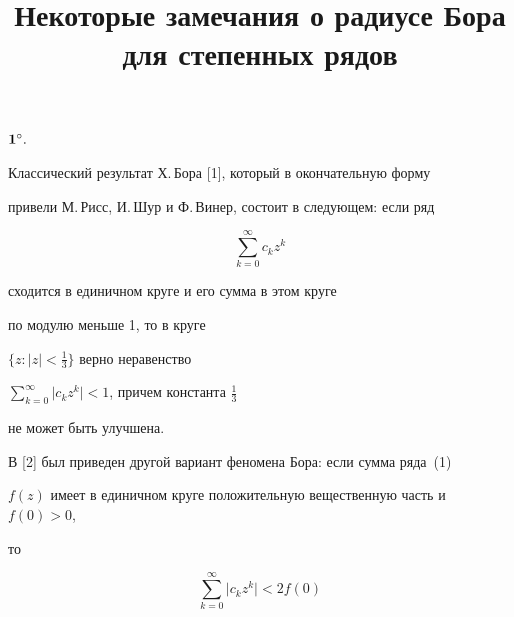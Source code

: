

\title{Некоторые замечания о радиусе Бора\\


для степенных рядов}





\date{}




\pagestyle{plain} %







\maketitle


\label{begin}











${\bold 1^\circ.}$


Классический результат Х.\,Бора [1], который в окончательную форму


привели М.\,Рисс, И.\,Шур и Ф.\,Винер, состоит в следующем: если ряд


\begin{equation}


\sum_{k=0}^{\infty} c_k z^k


\end{equation}


сходится в единичном круге и его сумма в этом круге


по модулю меньше 1, то в круге


$\{z: |z|< \frac{1}{3}\}$ верно неравенство


$\sum\limits_{k=0}^{\infty} \vert c_k z^k\vert<1$, причем константа $\frac13$


не может быть улучшена.


В [2] был приведен другой вариант феномена Бора: если сумма ряда~(1)


$f(z)$ имеет в единичном круге положительную вещественную часть и $f(0)>0$,


то


\begin{equation}


\sum\limits_{k=0}^{\infty} \vert c_k z^k\vert<2f(0)


\end{equation}


